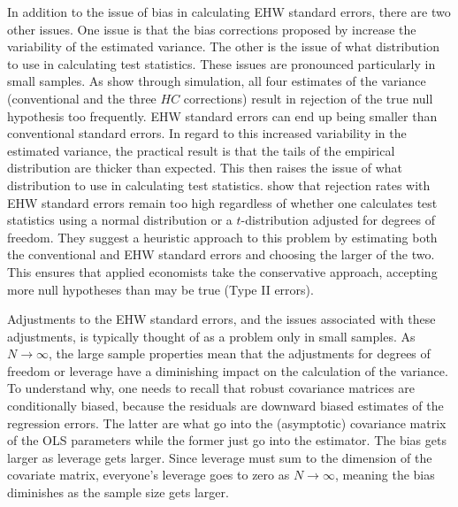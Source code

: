 \documentclass[11pt]{article}
\begin{document}
In addition to the issue of bias in calculating EHW standard errors, there are two other issues. One issue is that the bias corrections proposed by \cite{mackinnon_heteroskedasticity-consistent_1985} increase the variability of the estimated variance. The other is the issue of what distribution to use in calculating test statistics. These issues are pronounced particularly in small samples. As \cite{angrist_mostly_2009} show through simulation, all four estimates of the variance (conventional and the three $HC$ corrections) result in rejection of the true null hypothesis too frequently. EHW standard errors can end up being smaller than conventional standard errors. In regard to this increased variability in the estimated variance, the practical result is that the tails of the empirical distribution are thicker than expected. This then raises the issue of what distribution to use in calculating test statistics. \cite{angrist_mostly_2009} show that rejection rates with EHW standard errors remain too high regardless of whether one calculates test statistics using a normal distribution or a $t$-distribution adjusted for degrees of freedom. They suggest a heuristic approach to this problem by estimating both the conventional and EHW standard errors and choosing the larger of the two. This ensures that applied economists take the conservative approach, accepting more null hypotheses than may be true (Type II errors).

Adjustments to the EHW standard errors, and the issues associated with these adjustments, is typically thought of as a problem only in small samples. As $N \rightarrow \infty$, the large sample properties mean that the adjustments for degrees of freedom or leverage have a diminishing impact on the calculation of the variance. To understand why, one needs to recall that robust covariance matrices are conditionally biased, because the residuals are downward biased estimates of the regression errors. The latter are what go into the (asymptotic) covariance matrix of the OLS parameters while the former just go into the estimator. The bias gets larger as leverage gets larger. Since leverage must sum to the dimension of the covariate matrix, everyone’s leverage goes to zero as $N \rightarrow \infty$, meaning the bias diminishes as the sample size gets larger.
\end{document}
